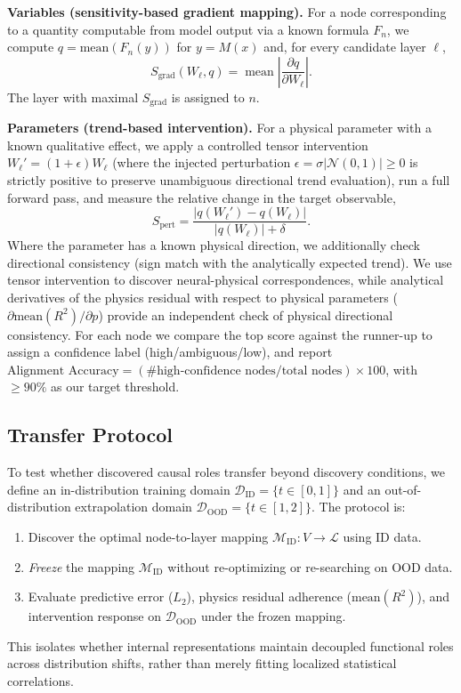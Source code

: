 \documentclass{article}
\begin{document}
\textbf{Variables (sensitivity-based gradient mapping).} For a node
corresponding to a quantity computable from model output via a known
formula $F_n$, we compute $q = \text{mean}(F_n(y))$ for $y=M(x)$ and, for
every candidate layer $\ell$,
\begin{equation}
S_{\mathrm{grad}}(W_\ell, q) = \operatorname{mean}\left|\frac{\partial q}{\partial W_\ell}\right|.
\end{equation}
The layer with maximal $S_{\mathrm{grad}}$ is assigned to $n$.

\textbf{Parameters (trend-based intervention).} For a physical parameter
with a known qualitative effect, we apply a controlled tensor intervention
$W_\ell' = (1+\epsilon)W_\ell$ (where the injected perturbation $\epsilon = \sigma|\mathcal{N}(0, 1)| \ge 0$ is strictly positive to preserve unambiguous directional trend evaluation), run a full forward pass, and measure the
relative change in the target observable,
\begin{equation}
S_{\mathrm{pert}} = \frac{|q(W_\ell') - q(W_\ell)|}{|q(W_\ell)| + \delta}.
\end{equation}
Where the parameter has a known physical direction, we additionally check
directional consistency (sign match with the analytically expected trend).
We use tensor intervention to discover neural-physical correspondences, while analytical derivatives of the physics residual with respect to physical parameters ($\partial \text{mean}(R^2)/\partial p$) provide an independent check of physical directional consistency.
For each node we compare the top score against the runner-up to assign a
confidence label (high/ambiguous/low), and report
$\text{Alignment Accuracy} = (\text{\# high-confidence nodes}/\text{total nodes})\times 100$,
with $\geq 90\%$ as our target threshold.

\subsection{Transfer Protocol}
To test whether discovered causal roles transfer beyond discovery conditions,
we define an in-distribution training domain $\mathcal{D}_{\text{ID}} = \{t \in [0, 1]\}$
and an out-of-distribution extrapolation domain $\mathcal{D}_{\text{OOD}} = \{t \in [1, 2]\}$.
The protocol is:
\begin{enumerate}
    \item Discover the optimal node-to-layer mapping $\mathcal{M}_{\text{ID}}: V \to \mathcal{L}$ using ID data.
    \item \emph{Freeze} the mapping $\mathcal{M}_{\text{ID}}$ without re-optimizing or re-searching on OOD data.
    \item Evaluate predictive error ($L_2$), physics residual adherence ($\text{mean}(R^2)$), and intervention response on $\mathcal{D}_{\text{OOD}}$ under the frozen mapping.
\end{enumerate}
This isolates whether internal representations maintain decoupled functional roles across distribution shifts, rather than merely fitting localized statistical correlations.
\end{document}
